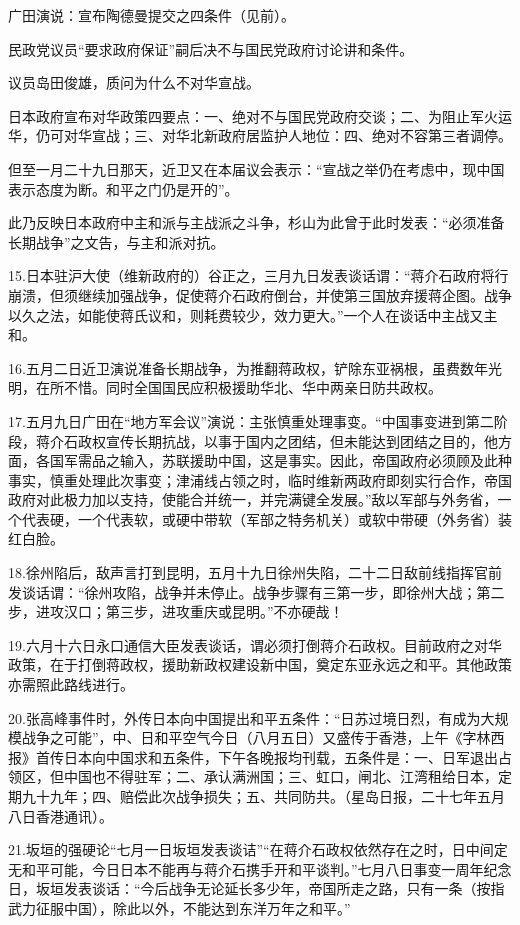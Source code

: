 广田演说：宣布陶德曼提交之四条件（见前）。

民政党议员“要求政府保证”嗣后决不与国民党政府讨论讲和条件。

议员岛田俊雄，质问为什么不对华宣战。

日本政府宣布对华政策四要点：一、绝对不与国民党政府交谈；二、为阻止军火运华，仍可对华宣战；三、对华北新政府居监护人地位：四、绝对不容第三者调停。

但至一月二十九日那天，近卫又在本届议会表示：“宣战之举仍在考虑中，现中国表示态度为断。和平之门仍是开的”。

此乃反映日本政府中主和派与主战派之斗争，杉山为此曾于此时发表：“必须准备长期战争”之文告，与主和派对抗。

15.日本驻沪大使（维新政府的）谷正之，三月九日发表谈话谓：“蒋介石政府将行崩溃，但须继续加强战争，促使蒋介石政府倒台，并使第三国放弃援蒋企图。战争以久之法，如能使蒋氏议和，则耗费较少，效力更大。”一个人在谈话中主战又主和。

16.五月二日近卫演说准备长期战争，为推翻蒋政权，铲除东亚祸根，虽费数年光明，在所不惜。同时全国国民应积极援助华北、华中两亲日防共政权。

17.五月九日广田在“地方军会议”演说：主张慎重处理事变。“中国事变进到第二阶段，蒋介石政权宣传长期抗战，以事于国内之团结，但未能达到团结之目的，他方面，各国军需品之输入，苏联援助中国，这是事实。因此，帝国政府必须顾及此种事实，慎重处理此次事变；津浦线占领之时，临时维新两政府即刻实行合作，帝国政府对此极力加以支持，使能合并统一，并完满键全发展。”敌以军部与外务省，一个代表硬，一个代表软，或硬中带软（军部之特务机关）或软中带硬（外务省）装红白脸。

18.徐州陷后，敌声言打到昆明，五月十九日徐州失陷，二十二日敌前线指挥官前发谈话谓：“徐州攻陷，战争并未停止。战争步骤有三第一步，即徐州大战；第二步，进攻汉口；第三步，进攻重庆或昆明。”不亦硬哉！

19.六月十六日永口通信大臣发表谈话，谓必须打倒蒋介石政权。目前政府之对华政策，在于打倒蒋政权，援助新政权建设新中国，奠定东亚永远之和平。其他政策亦需照此路线进行。

20.张高峰事件时，外传日本向中国提出和平五条件：“日苏过境日烈，有成为大规模战争之可能”，中、日和平空气今日（八月五日）又盛传于香港，上午《字林西报》首传日本向中国求和五条件，下午各晚报均刊载，五条件是：一、日军退出占领区，但中国也不得驻军；二、承认满洲国；三、虹口，闸北、江湾租给日本，定期九十九年；四、赔偿此次战争损失；五、共同防共。（星岛日报，二十七年五月八日香港通讯）。

21.坂垣的强硬论“七月一日坂垣发表谈诘”“在蒋介石政权依然存在之时，日中间定无和平可能，今日日本不能再与蒋介石携手开和平谈判。”七月八日事变一周年纪念日，坂垣发表谈话：“今后战争无论延长多少年，帝国所走之路，只有一条（按指武力征服中国），除此以外，不能达到东洋万年之和平。”

